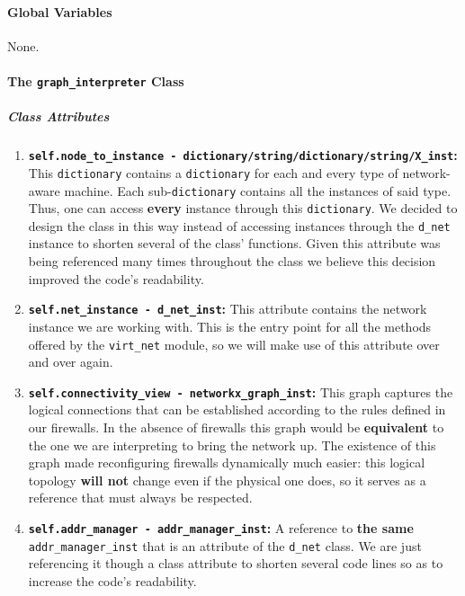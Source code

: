     \paragraph{Global Variables}
        None.

    \paragraph{The \texttt{graph\_interpreter} Class}
        \subparagraph{Class Attributes}
            \begin{enumerate}
                \item \textbf{\texttt{self.node\_to\_instance - dictionary/string/dictionary/string/X\_inst}:} This \texttt{dictionary} contains a \texttt{dictionary} for each and every type of network-aware machine. Each sub-\texttt{dictionary} contains all the instances of said type. Thus, one can access \textbf{every} instance through this \texttt{dictionary}. We decided to design the class in this way instead of accessing instances through the \texttt{d\_net} instance to shorten several of the class' functions. Given this attribute was being referenced many times throughout the class we believe this decision improved the code's readability.
                \item \textbf{\texttt{self.net\_instance - d\_net\_inst}:} This attribute contains the network instance we are working with. This is the entry point for all the methods offered by the \texttt{virt\_net} module, so we will make use of this attribute over and over again.
                \item \textbf{\texttt{self.connectivity\_view - networkx\_graph\_inst}:}  This graph captures the logical connections that can be established according to the rules defined in our firewalls. In the absence of firewalls this graph would be \textbf{equivalent} to the one we are interpreting to bring the network up. The existence of this graph made reconfiguring firewalls dynamically much easier: this logical topology \textbf{will not} change even if the physical one does, so it serves as a reference that must always be respected.
                \item \textbf{\texttt{self.addr\_manager - addr\_manager\_inst}:} A reference to \textbf{the same} \texttt{addr\_manager\_inst} that is an attribute of the \texttt{d\_net} class. We are just referencing it though a class attribute to shorten several code lines so as to increase the code's readability.
            \end{enumerate}

